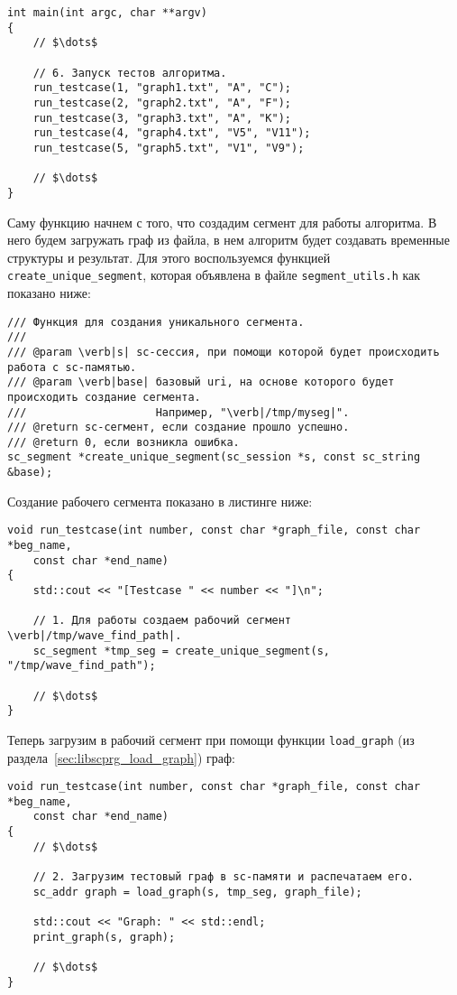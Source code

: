 \begin{lstlisting}[texcl]
int main(int argc, char **argv)
{
    // $\dots$

    // 6. Запуск тестов алгоритма.
    run_testcase(1, "graph1.txt", "A", "C");
    run_testcase(2, "graph2.txt", "A", "F");
    run_testcase(3, "graph3.txt", "A", "K");
    run_testcase(4, "graph4.txt", "V5", "V11");
    run_testcase(5, "graph5.txt", "V1", "V9");

    // $\dots$
}
\end{lstlisting}

Саму функцию начнем с того, что создадим сегмент для работы
алгоритма. В него будем загружать граф из файла, в нем алгоритм будет
создавать временные структуры и результат. Для этого воспользуемся
функцией \lstinline|create_unique_segment|, которая объявлена в файле
\verb|segment_utils.h| как показано ниже:

\begin{lstlisting}[texcl]
/// Функция для создания уникального сегмента.
///
/// @param \verb|s| sc-сессия, при помощи которой будет происходить работа с sc-памятью.
/// @param \verb|base| базовый uri, на основе которого будет происходить создание сегмента.
///                    Например, "\verb|/tmp/myseg|".
/// @return sc-сегмент, если создание прошло успешно.
/// @return 0, если возникла ошибка.
sc_segment *create_unique_segment(sc_session *s, const sc_string &base);
\end{lstlisting}

Создание рабочего сегмента показано в листинге ниже:

\begin{lstlisting}[texcl]
void run_testcase(int number, const char *graph_file, const char *beg_name,
    const char *end_name)
{
    std::cout << "[Testcase " << number << "]\n";

    // 1. Для работы создаем рабочий сегмент \verb|/tmp/wave_find_path|.
    sc_segment *tmp_seg = create_unique_segment(s, "/tmp/wave_find_path");

    // $\dots$
}
\end{lstlisting}

Теперь загрузим в рабочий сегмент при помощи функции
\lstinline|load_graph| (из раздела~\ref{sec:libscprg_load_graph})
граф:

\begin{lstlisting}[texcl]
void run_testcase(int number, const char *graph_file, const char *beg_name,
    const char *end_name)
{
    // $\dots$

    // 2. Загрузим тестовый граф в sc-памяти и распечатаем его.
    sc_addr graph = load_graph(s, tmp_seg, graph_file);

    std::cout << "Graph: " << std::endl;
    print_graph(s, graph);

    // $\dots$
}
\end{lstlisting}

